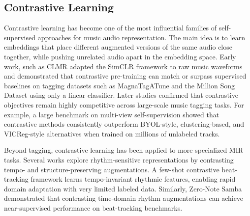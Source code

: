\documentclass[12pt]{report}
\begin{document}



\subsection{Contrastive Learning}
Contrastive learning has become one of the most influential families of self-supervised approaches for music audio representation. The main idea is to learn embeddings that place different augmented versions of the same audio close together, while pushing unrelated audio apart in the embedding space. Early work, such as CLMR \cite{spijkervet_contrastive_2021} adapted the SimCLR framework to raw music waveforms and demonstrated that contrastive pre-training can match or surpass supervised baselines on tagging datasets such as MagnaTagATune and the Million Song Dataset using only a linear classifier. Later studies confirmed that contrastive objectives remain highly competitive across large-scale music tagging tasks. For example, a large benchmark on multi-view self-supervision \cite{meseguer-brocal_experimental_2024} showed that contrastive methods consistently outperform BYOL-style, clustering-based, and VICReg-style alternatives when trained on millions of unlabeled tracks.

Beyond tagging, contrastive learning has been applied to more specialized MIR tasks. Several works explore rhythm-sensitive representations by contrasting tempo- and structure-preserving augmentations. A few-shot contrastive beat-tracking framework \cite{gagnere_contrastive_2024} learns tempo-invariant rhythmic features, enabling rapid domain adaptation with very limited labeled data. Similarly, Zero-Note Samba \cite{desblancs_zero-note_2023} demonstrated that contrasting time-domain rhythm augmentations can achieve near-supervised performance on beat-tracking benchmarks.
\end{document}
